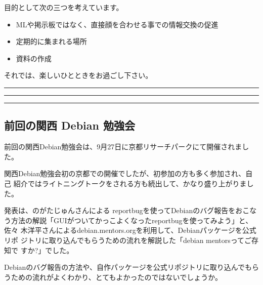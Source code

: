 \documentclass[mingoth,a4paper]{jsarticle}
\begin{document}
 目的として次の三つを考えています。
 \begin{itemize}
  \item MLや掲示板ではなく、直接顔を合わせる事での情報交換の促進
  \item 定期的に集まれる場所
  \item 資料の作成
 \end{itemize}

 それでは、楽しいひとときをお過ごし下さい。

\newpage

\begin{minipage}[b]{0.2\hsize}
 {}
\end{minipage}
\begin{minipage}[b]{0.8\hsize}
\hrule
\vspace{2mm}
\hrule
\setcounter{tocdepth}{1}
\tableofcontents
\vspace{2mm}
\hrule
\end{minipage}


\subsection{前回の関西 Debian 勉強会}

前回の関西Debian勉強会は、9月27日に京都リサーチパークにて開催されました。

関西Debian勉強会初の京都での開催でしたが、初参加の方も多く参加され、自己
紹介ではライトニングトークをされる方も続出して、かなり盛り上がりました。

発表は、のがたじゅんさんによる reportbugを使ってDebianのバグ報告をおこな
う方法の解説「GUIがついてかっこよくなったreportbugを使ってみよう」と、佐々
木洋平さんによるdebian.mentors.orgを利用して、Debianパッケージを公式リポ
ジトリに取り込んでもらうための流れを解説した「debian mentorsってご存知で
すか?」でした。

Debianのバグ報告の方法や、自作パッケージを公式リポジトリに取り込んでもら
うための流れがよくわかり、とてもよかったのではないでしょうか。
\end{document}
